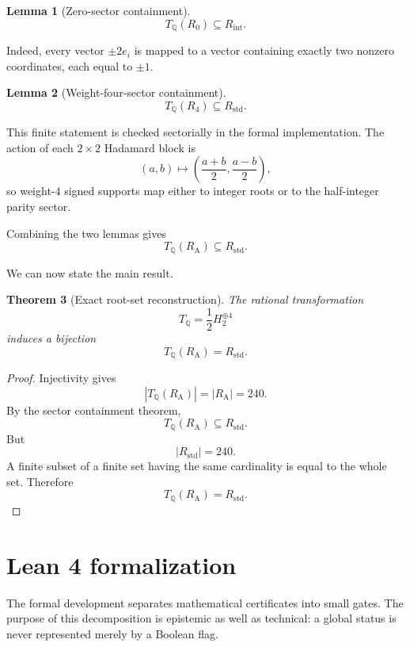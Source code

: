\documentclass[11pt,a4paper]{article}
\newtheorem{theorem}{Theorem}[section]
\newtheorem{lemma}[theorem]{Lemma}
\theoremstyle{definition}
\theoremstyle{remark}
\newcommand{\RA}{R_{\mathrm A}}
\newcommand{\Rstd}{R_{\mathrm{std}}}
\newcommand{\TQ}{T_{\mathbb Q}}
\begin{document}
	\begin{lemma}[Zero-sector containment]
		\[
		\TQ(R_0)\subseteq R_{\mathrm{int}}.
		\]
	\end{lemma}
	
	Indeed, every vector $\pm2e_i$ is mapped to a vector containing exactly two
	nonzero coordinates, each equal to $\pm1$.
	
	\begin{lemma}[Weight-four-sector containment]
		\[
		\TQ(R_4)
		\subseteq
		\Rstd.
		\]
	\end{lemma}
	
	This finite statement is checked sectorially in the formal implementation.
	The action of each $2\times2$ Hadamard block is
	\[
	(a,b)
	\longmapsto
	\left(
	\frac{a+b}{2},
	\frac{a-b}{2}
	\right),
	\]
	so weight-$4$ signed supports map either to integer roots or to the
	half-integer parity sector.
	
	Combining the two lemmas gives
	\[
	\boxed{
		\TQ(\RA)\subseteq\Rstd.
	}
	\]
	
	We can now state the main result.
	
	\begin{theorem}[Exact root-set reconstruction]
		\label{thm:root-reconstruction}
		The rational transformation
		\[
		\TQ=\frac12H_2^{\oplus4}
		\]
		induces a bijection
		\[
		\boxed{
			\TQ(\RA)=\Rstd.
		}
		\]
	\end{theorem}
	
	\begin{proof}
		Injectivity gives
		\[
		|\TQ(\RA)|=|\RA|=240.
		\]
		By the sector containment theorem,
		\[
		\TQ(\RA)\subseteq\Rstd.
		\]
		But
		\[
		|\Rstd|=240.
		\]
		A finite subset of a finite set having the same cardinality is equal to the
		whole set.  Therefore
		\[
		\TQ(\RA)=\Rstd.
		\]
	\end{proof}
	
	\section{Lean 4 formalization}
	
	The formal development separates mathematical certificates into small gates.
	The purpose of this decomposition is epistemic as well as technical:
	a global status is never represented merely by a Boolean flag.
	
\end{document}
